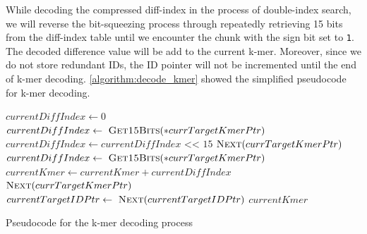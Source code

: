 While decoding the compressed diff-index in the process of double-index search, we will reverse the bit-squeezing process through repeatedly retrieving 15 bits from the diff-index table until we encounter the chunk with the sign bit set to \texttt{1}. The decoded difference value will be add to the current k-mer. Moreover, since we do not store redundant IDs, the ID pointer will not be incremented until the end of k-mer decoding. \cref{algorithm:decode_kmer} showed the simplified pseudocode for k-mer decoding.

\begin{algorithm}[htbp]
  \begin{algorithmic}

    \State $currentDiffIndex \gets 0$\;
    \State $currentDiffIndex \gets\ \textsc{Get15Bits}(*currTargetKmerPtr)$
    \State $currentDiffIndex \gets currentDiffIndex \texttt{ << } 15$
    \State $\textsc{Next}(currTargetKmerPtr)$
    \EndWhile
    \State $currentDiffIndex \gets\ \textsc{Get15Bits}(*currTargetKmerPtr)$
    \State $currentKmer \gets currentKmer + currentDiffIndex$
    \State $\textsc{Next}(currTargetKmerPtr)$
    \State $currentTargetIDPtr \gets\ \textsc{Next}(currentTargetIDPtr)$
    \Return $currentKmer$
    \EndProcedure
    \caption{ Pseudocode for the k-mer decoding process} \label{algorithm:decode_kmer}
  \end{algorithmic}
\end{algorithm}


